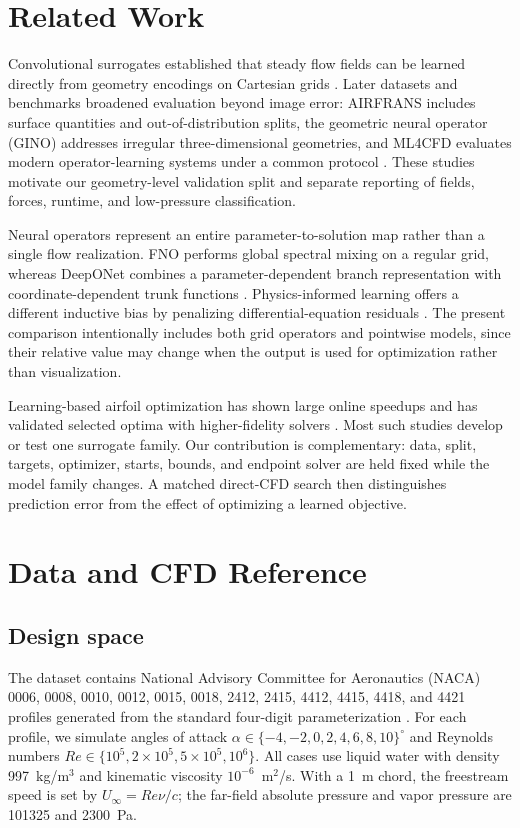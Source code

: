 \documentclass[conference]{IEEEtran}
\begin{document}
\section{Related Work}
Convolutional surrogates established that steady flow fields can be learned
directly from geometry encodings on Cartesian grids
\cite{guo2016steady,bhatnagar2019aerodynamic,thuerey2020rans}. Later datasets
and benchmarks broadened evaluation beyond image error: AIRFRANS includes
surface quantities and out-of-distribution splits, the geometric neural
operator (GINO) addresses irregular three-dimensional geometries, and ML4CFD evaluates modern operator-learning
systems under a common protocol
\cite{bonnet2022airfrans,li2023gino,yagoubi2025ml4cfd}. These studies motivate
our geometry-level validation split and separate reporting of fields, forces,
runtime, and low-pressure classification.

Neural operators represent an entire parameter-to-solution map rather than a
single flow realization. FNO performs global spectral mixing on a regular
grid, whereas DeepONet combines a parameter-dependent branch representation
with coordinate-dependent trunk functions
\cite{li2021fno,lu2021deeponet,kovachki2023neural}. Physics-informed learning
offers a different inductive bias by penalizing differential-equation
residuals \cite{raissi2019pinn,li2024pino}. The present comparison intentionally
includes both grid operators and pointwise models, since their relative value
may change when the output is used for optimization rather than visualization.

Learning-based airfoil optimization has shown large online speedups and has
validated selected optima with higher-fidelity solvers
\cite{li2022mlaso,shukla2023operators}. Most such studies develop or test one
surrogate family. Our contribution is complementary: data, split, targets,
optimizer, starts, bounds, and endpoint solver are held fixed while the model
family changes. A matched direct-CFD search then distinguishes prediction error
from the effect of optimizing a learned objective.

\section{Data and CFD Reference}
\subsection{Design space}
The dataset contains National Advisory Committee for Aeronautics (NACA) 0006,
0008, 0010, 0012, 0015, 0018, 2412, 2415, 4412, 4415, 4418, and 4421 profiles
generated from the standard four-digit parameterization
\cite{abbott1959airfoils}. For each profile, we simulate angles of attack
$\alpha\in\{-4,-2,0,2,4,6,8,10\}^{\circ}$ and Reynolds numbers
$Re\in\{10^5,2\times10^5,5\times10^5,10^6\}$. All cases use liquid water
with density 997~kg/m$^3$ and kinematic viscosity $10^{-6}$~m$^2$/s. With a
1~m chord, the freestream speed is set by $U_\infty=Re\nu/c$; the far-field
absolute pressure and vapor pressure are 101325 and 2300~Pa.
\end{document}
